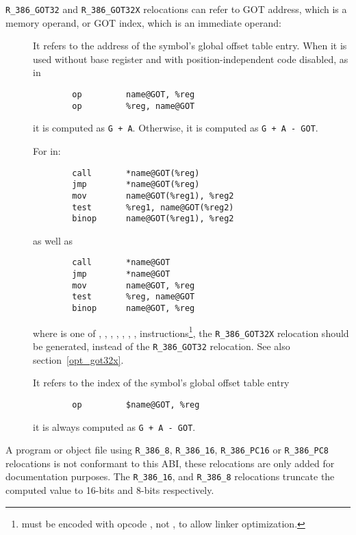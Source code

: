 \texttt{R_386_GOT32} and \texttt{R_386_GOT32X} relocations can refer
to GOT address, which is a memory operand, or GOT index, which is an
immediate operand:

\begin{description}
\item[] It refers to the address of the symbol's global
offset table entry.  When it is used without base register and with
position-independent code disabled, as in

\begin{verbatim}
        op         name@GOT, %reg
        op         %reg, name@GOT
\end{verbatim}

\noindent
it is computed as \texttt{G + A}.  Otherwise, it is computed as
\texttt{G + A - GOT}.

For  in:
\begin{verbatim}
        call       *name@GOT(%reg)
        jmp        *name@GOT(%reg)
        mov        name@GOT(%reg1), %reg2
        test       %reg1, name@GOT(%reg2)
        binop      name@GOT(%reg1), %reg2
\end{verbatim}

\noindent
as well as

\begin{verbatim}
        call       *name@GOT
        jmp        *name@GOT
        mov        name@GOT, %reg
        test       %reg, name@GOT
        binop      name@GOT, %reg
\end{verbatim}

\noindent
where  is one of , , ,
, , , , 
instructions\footnote{ must be encoded with
opcode , not , to allow linker optimization.},
the \texttt{R_386_GOT32X} relocation should be generated, instead of
the \texttt{R_386_GOT32} relocation.  See also section~\ref{opt_got32x}.

\item[] It refers to the index of the symbol's global
offset table entry

\begin{verbatim}
        op         $name@GOT, %reg
\end{verbatim}
it is always computed as \texttt{G + A - GOT}.
\end{description}

\begin{sloppypar}
A program or object file using \texttt{R_386_8},
\texttt{R_386_16}, \texttt{R_386_PC16} or \texttt{R_386_PC8}
relocations is not conformant to this ABI, these relocations are only
added for documentation purposes.  The \texttt{R_386_16}, and
\texttt{R_386_8} relocations truncate the computed value to 16-bits
and 8-bits respectively.
\end{sloppypar}

